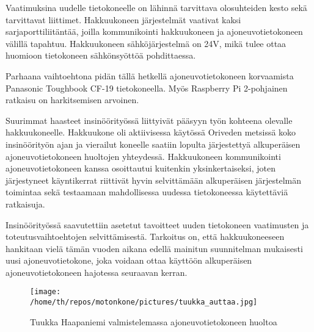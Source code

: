 \documentclass[11pt,a4paper,oneside,article]{memoir}
\begin{document}
Vaatimuksina uudelle tietokoneelle on lähinnä tarvittava olosuhteiden kesto sekä tarvittavat liittimet. Hakkuukoneen järjestelmät vaativat kaksi sarjaporttiliitäntää, joilla kommunikointi hakkuukoneen ja ajoneuvotietokoneen välillä tapahtuu. Hakkuukoneen sähköjärjestelmä on 24V, mikä tulee ottaa huomioon tietokoneen sähkönsyöttöä pohdittaessa.

Parhaana vaihtoehtona pidän tällä hetkellä ajoneuvotietokoneen korvaamista Panasonic Toughbook CF-19 tietokoneella. Myös Raspberry Pi 2-pohjainen ratkaisu on harkitsemisen arvoinen.

Suurimmat haasteet insinöörityössä liittyivät pääsyyn työn kohteena olevalle hakkuukoneelle. Hakkuukone oli aktiivisessa käytössä Oriveden metsissä koko insinöörityön ajan ja vierailut koneelle saatiin lopulta järjestettyä alkuperäisen ajoneuvotietokoneen huoltojen yhteydessä. Hakkuukoneen kommunikointi ajoneuvotietokoneen kanssa osoittautui kuitenkin yksinkertaiseksi, joten järjestyneet käyntikerrat riittivät hyvin selvittämään alkuperäisen järjestelmän toimintaa sekä testaamaan mahdollisessa uudessa tietokoneessa käytettäviä ratkaisuja.


Insinöörityössä saavutettiin asetetut tavoitteet uuden tietokoneen vaatimusten ja toteutusvaihtoehtojen selvittämisestä. Tarkoitus on, että hakkuukoneeseen hankitaan vielä tämän vuoden aikana edellä mainitun suunnitelman mukaisesti uusi ajoneuvotietokone, joka voidaan ottaa käyttöön alkuperäisen ajoneuvotietokoneen hajotessa seuraavan kerran.



\begin{figure}[H]
\centering
\texttt{[image: /home/th/repos/motonkone/pictures/tuukka\_auttaa.jpg]}
\caption{Tuukka Haapaniemi valmistelemassa ajoneuvotietokoneen huoltoa}
\end{figure}
\newpage
\end{document}
